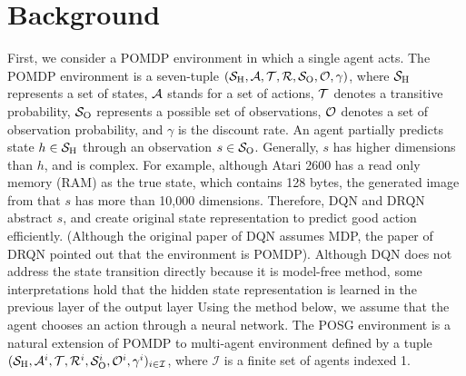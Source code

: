 \section{Background}
First, we consider a POMDP environment in which a single agent acts.
The POMDP environment is a seven-tuple $(\S, \A, \Trans, \R, \Observations, \ObProb, \gamma)$,
where $\S$ represents a set of states, $\A$ stands for a set of actions, $\Trans$ denotes a transitive probability, 
$\Observations$ represents a possible set of observations, $\ObProb$ denotes a set of observation probability, and
$\gamma$ is the discount rate.
An agent partially predicts state $h \in \S$ through an observation $s \in \Observations$.
Generally, $s$ has higher dimensions than $h$, and is complex.
For example, although Atari 2600 has a read only memory (RAM) as the true state, which contains 128 bytes,
the generated image from that $s$ has more than 10,000 dimensions.
Therefore, DQN and DRQN abstract $s$, and create original state representation to predict good action efficiently.
(Although the original paper of DQN assumes MDP, the paper of DRQN pointed out that the environment is POMDP).
Although DQN does not address the state transition directly because it is model-free method, 
some interpretations hold that the hidden state representation is learned in the previous layer of the output layer \citep{zahavy2016graying}
Using the method below, we assume that the agent chooses an action through a neural network.
The POSG environment is a natural extension of POMDP to multi-agent environment defined by a tuple $(\S, \A^i, \Trans, \R^i, \Observations^i, \ObProb^i, \gamma^i)_{i \in \mathcal{I}}$,
where $\mathcal{I}$ is a finite set of agents indexed 1.


